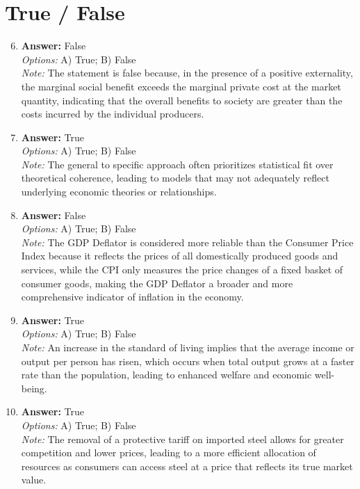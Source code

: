 \documentclass[12pt]{article}
\begin{document}
\section*{True / False}
\begin{enumerate}[label=\arabic*.]
\setcounter{enumi}{5}
\item \textbf{Answer:} False
\\ \textit{Options:} A) True; B) False
\\ \textit{Note:} The statement is false because, in the presence of a positive externality, the marginal social benefit exceeds the marginal private cost at the market quantity, indicating that the overall benefits to society are greater than the costs incurred by the individual producers.
\item \textbf{Answer:} True
\\ \textit{Options:} A) True; B) False
\\ \textit{Note:} The general to specific approach often prioritizes statistical fit over theoretical coherence, leading to models that may not adequately reflect underlying economic theories or relationships.
\item \textbf{Answer:} False
\\ \textit{Options:} A) True; B) False
\\ \textit{Note:} The GDP Deflator is considered more reliable than the Consumer Price Index because it reflects the prices of all domestically produced goods and services, while the CPI only measures the price changes of a fixed basket of consumer goods, making the GDP Deflator a broader and more comprehensive indicator of inflation in the economy.
\item \textbf{Answer:} True
\\ \textit{Options:} A) True; B) False
\\ \textit{Note:} An increase in the standard of living implies that the average income or output per person has risen, which occurs when total output grows at a faster rate than the population, leading to enhanced welfare and economic well-being.
\item \textbf{Answer:} True
\\ \textit{Options:} A) True; B) False
\\ \textit{Note:} The removal of a protective tariff on imported steel allows for greater competition and lower prices, leading to a more efficient allocation of resources as consumers can access steel at a price that reflects its true market value.
\end{enumerate}
\end{document}
